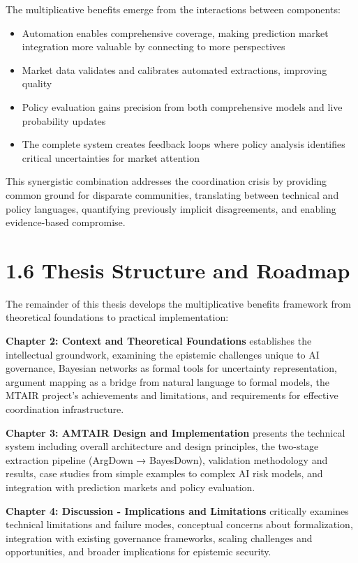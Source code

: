 \documentclass[
  11pt,
  letterpaper,
  openany]{book}
\providecommand{\tightlist}{%
  \setlength{\itemsep}{0pt}\setlength{\parskip}{0pt}}
\begin{document}
The multiplicative benefits emerge from the interactions between
components:

\begin{itemize}
\tightlist
\item
  Automation enables comprehensive coverage, making prediction market
  integration more valuable by connecting to more perspectives
\item
  Market data validates and calibrates automated extractions, improving
  quality
\item
  Policy evaluation gains precision from both comprehensive models and
  live probability updates
\item
  The complete system creates feedback loops where policy analysis
  identifies critical uncertainties for market attention
\end{itemize}

This synergistic combination addresses the coordination crisis by
providing common ground for disparate communities, translating between
technical and policy languages, quantifying previously implicit
disagreements, and enabling evidence-based compromise.

\section{1.6 Thesis Structure and
Roadmap}\label{thesis-structure-and-roadmap}

The remainder of this thesis develops the multiplicative benefits
framework from theoretical foundations to practical implementation:

\textbf{Chapter 2: Context and Theoretical Foundations} establishes the
intellectual groundwork, examining the epistemic challenges unique to AI
governance, Bayesian networks as formal tools for uncertainty
representation, argument mapping as a bridge from natural language to
formal models, the MTAIR project's achievements and limitations, and
requirements for effective coordination infrastructure.

\textbf{Chapter 3: AMTAIR Design and Implementation} presents the
technical system including overall architecture and design principles,
the two-stage extraction pipeline (ArgDown → BayesDown), validation
methodology and results, case studies from simple examples to complex AI
risk models, and integration with prediction markets and policy
evaluation.

\textbf{Chapter 4: Discussion - Implications and Limitations} critically
examines technical limitations and failure modes, conceptual concerns
about formalization, integration with existing governance frameworks,
scaling challenges and opportunities, and broader implications for
epistemic security.
\end{document}
